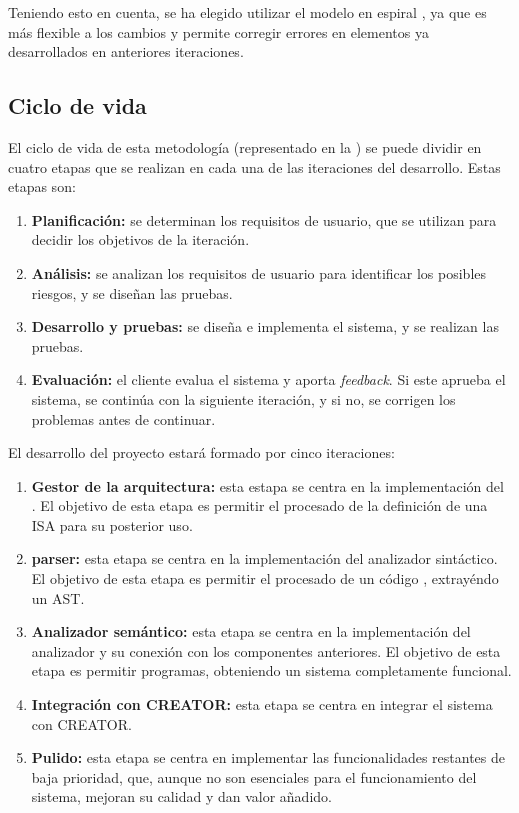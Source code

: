 Teniendo esto en cuenta, se ha elegido utilizar el modelo en espiral
\parencite{spiral-model}, ya que es más flexible a los cambios y permite
corregir errores en elementos ya desarrollados en anteriores iteraciones.

\subsection{Ciclo de vida}\label{subsec:life-cycle}

El ciclo de vida de esta metodología (representado en la
) se puede dividir en cuatro etapas que se realizan en
cada una de las iteraciones del desarrollo. Estas etapas son:

\begin{enumerate}
    \item \textbf{Planificación:} se determinan los requisitos de usuario, que
    se utilizan para decidir los objetivos de la iteración.
    \item \textbf{Análisis:} se analizan los requisitos de usuario para
    identificar los posibles riesgos, y se diseñan las pruebas.
    \item \textbf{Desarrollo y pruebas:} se diseña e implementa el sistema, y se
    realizan las pruebas.
    \item \textbf{Evaluación:} el cliente evalua el sistema y aporta
    \textit{feedback}. Si este aprueba el sistema, se continúa con la siguiente
    iteración, y si no, se corrigen los problemas antes de continuar.
\end{enumerate}


\noindent
El desarrollo del proyecto estará formado por cinco iteraciones:

\begin{enumerate}[label=\Roman*.]
    \item \textbf{Gestor de la arquitectura:} esta estapa se centra en la
    implementación del . El objetivo de
    esta etapa es permitir el procesado de la definición de una \gls{ISA} para
    su posterior uso.
    \item \textbf{\Gls{parser}:} esta etapa se centra en la implementación del
    analizador sintáctico. El objetivo de esta etapa es permitir el procesado de
    un código , extrayéndo un \gls{AST}.
    \item \textbf{Analizador semántico:} esta etapa se centra en la implementación
    del analizador y su conexión con los componentes anteriores.
    El objetivo de esta etapa es permitir 
    programas, obteniendo un sistema completamente funcional.
    \item \textbf{Integración con CREATOR:} esta etapa se centra en integrar el
    sistema con CREATOR.
    \item \textbf{Pulido:} esta etapa se centra en implementar las
    funcionalidades restantes de baja prioridad, que, aunque no son esenciales
    para el funcionamiento del sistema, mejoran su calidad y dan valor añadido.
\end{enumerate}

